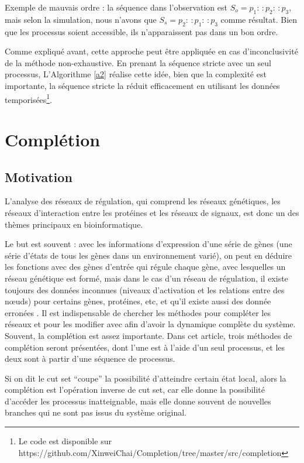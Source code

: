 \documentclass[11pt]{report}
\theoremstyle{definition}
\begin{document}
Exemple de mauvais ordre : la s\'equence dans l'observation est $S_o=p_1:\,:p_2:\,:p_3$, mais selon la simulation, nous n'avons que $S_s=p_2:\,:p_1:\,:p_3$ comme r\'esultat. Bien que les processus soient accessible, ils n'apparaissent pas dans un bon ordre.

Comme expliqu\'e avant, cette approche peut \^etre appliqu\'ee en cas d'inconclusivit\'e de la m\'ethode non-exhaustive. En prenant la s\'equence stricte avec un seul processus,  
L'Algorithme \ref{a2} r\'ealise cette id\'ee, bien que la complexit\'e est importante, la s\'equence stricte la r\'eduit efficacement en utilisant les donn\'ees temporis\'ees\footnote{Le code est disponible sur https://github.com/XinweiChai/Completion/tree/master/src/completion}.
\chapter{Compl\'etion}\label{complet}
\section{Motivation}
L'analyse des r\'eseaux de r\'egulation, qui comprend les r\'eseaux g\'en\'etiques, les r\'eseaux d'interaction entre les prot\'eines et les r\'eseaux de signaux, est donc un des th\`emes principaux en bioinformatique.

Le but est souvent : avec les informations d'expression d'une s\'erie de g\`enes (une s\'erie d'\'etats de tous les g\`enes dans un environnement vari\'e), on peut en d\'eduire les fonctions avec des g\`enes d'entr\'ee qui r\'egule chaque g\`ene, avec lesquelles un r\'eseau g\'en\'etique est form\'e, mais dans le cas d'un r\'eseau de r\'egulation, il existe toujours des donn\'ees inconnues (niveaux d'activation et les relations entre des n\oe uds) pour certains g\`enes, prot\'eines, etc, et qu'il existe aussi des donn\'ee erron\'ees \citep{Akutsu2009}. Il est indispensable de chercher les m\'ethodes pour compl\'eter les r\'eseaux et pour les modifier avec afin d'avoir la dynamique compl\`ete du syst\`eme. Souvent, la compl\'etion est assez importante. Dans cet article, trois m\'ethodes de compl\'etion seront pr\'esent\'ees, dont l'une est \`a l'aide d'un seul processus, et les deux sont \`a partir d'une s\'equence de processus.

Si on dit le cut set ``coupe'' la possibilit\'e d'atteindre certain \'etat local, alors la compl\'etion est l'op\'eration inverse de cut set, car elle donne la possibilit\'e d'acc\'eder les processus inatteignable, mais elle donne souvent de nouvelles branches qui ne sont pas issus du syst\`eme original.
\end{document}
